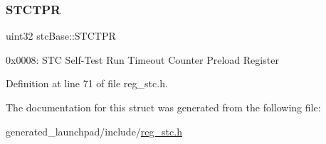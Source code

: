 \subsubsection{\texorpdfstring{S\+T\+C\+T\+PR}{STCTPR}}
{\footnotesize\ttfamily uint32 stc\+Base\+::\+S\+T\+C\+T\+PR}

0x0008\+: S\+TC Self-\/\+Test Run Timeout Counter Preload Register 

Definition at line 71 of file reg\+\_\+stc.\+h.



The documentation for this struct was generated from the following file\+:\begin{DoxyCompactItemize}
\item 
generated\+\_\+launchpad/include/\mbox{\hyperlink{reg__stc_8h}{reg\+\_\+stc.\+h}}\end{DoxyCompactItemize}
